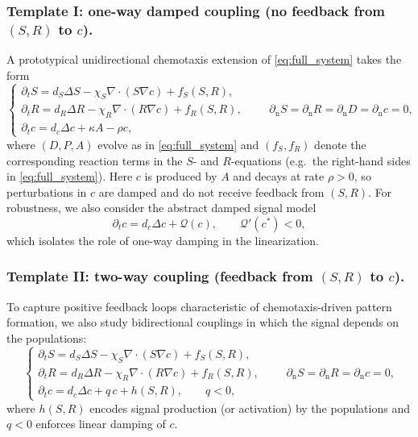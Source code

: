 \documentclass[pdflatex,sn-mathphys-ay]{sn-jnl}
\theoremstyle{thmstyleone}
\theoremstyle{definition}
\theoremstyle{remark}
\begin{document}
\subsubsection{Template I: one-way damped coupling (no feedback from $(S,R)$ to $c$).}
A prototypical unidirectional chemotaxis extension of \eqref{eq:full_system} takes the form
\begin{equation}
\label{eq:chemo_oneway_template}
\begin{cases}
\partial_t S = d_S\Delta S - \chi_S\nabla\cdot(S\nabla c) + f_S(S,R),\\[4pt]
\partial_t R = d_R\Delta R - \chi_R\nabla\cdot(R\nabla c) + f_R(S,R),\\[4pt]
\partial_t c = d_c\Delta c + \kappa A - \rho c,
\end{cases}
\qquad \partial_{\mathrm n}S=\partial_{\mathrm n}R=\partial_{\mathrm n}D=\partial_{\mathrm n}c=0,
\end{equation}
where $(D,P,A)$ evolve as in \eqref{eq:full_system} and $(f_S,f_R)$ denote the corresponding reaction terms in the $S$- and
$R$-equations (e.g.\ the right-hand sides in \eqref{eq:full_system}).
Here $c$ is produced by $A$ and decays at rate $\rho>0$, so perturbations in $c$ are damped and do not receive feedback from
$(S,R)$. For robustness, we also consider the abstract damped signal model
\begin{equation*}
\partial_t c = d_c\Delta c + \mathcal{Q}(c), \qquad \mathcal{Q}'(c^*)<0,
\end{equation*}
which isolates the role of one-way damping in the linearization.

\subsubsection{Template II: two-way coupling (feedback from $(S,R)$ to $c$).}
To capture positive feedback loops characteristic of chemotaxis-driven pattern formation, we also study
bidirectional couplings in which the signal depends on the populations:
\begin{equation}
\label{eq:chemo_twoway_template}
\begin{cases}
\partial_t S = d_S\Delta S - \chi_S\nabla\cdot(S\nabla c) + f_S(S,R),\\[4pt]
\partial_t R = d_R\Delta R - \chi_R\nabla\cdot(R\nabla c) + f_R(S,R),\\[4pt]
\partial_t c = d_c\Delta c + q\,c + h(S,R), \qquad q<0,
\end{cases}
\qquad \partial_{\mathrm n}S=\partial_{\mathrm n}R=\partial_{\mathrm n}c=0,
\end{equation}
where $h(S,R)$ encodes signal production (or activation) by the populations and $q<0$ enforces linear damping of $c$.
\end{document}
